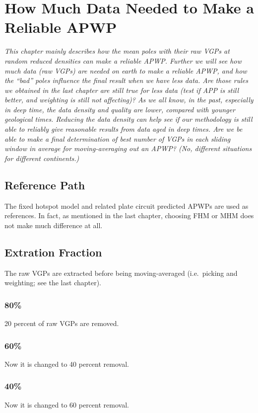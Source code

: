 \chapter{How Much Data Needed to Make a Reliable APWP}\label{chap:DatNeed}
\textit{This chapter mainly describes how the mean poles with their raw VGPs
at random reduced densities can make a reliable APWP\@. Further we will see how
much data (raw VGPs) are needed on earth to make a reliable APWP, and how the
``bad'' poles influence the final result when we have less data. Are those
rules we obtained in the last chapter are still true for less data (test if APP
is still better, and weighting is still not affecting)? As we all know, in the
past, especially in deep time, the data density and quality are lower, compared
with younger geological times. Reducing the data density can help see if our
methodology is still able to reliably give reasonable results from data aged in
deep times. Are we be able to make a final determination of best number of VGPs
in each sliding window in average for moving-averaging out an APWP? (No,
different situations for different continents.)}
\vfill
\minitoc\newpage

\section{Reference Path}

The fixed hotspot model and related plate circuit predicted APWPs are used as
references. In fact, as mentioned in the last chapter, choosing FHM or MHM does
not make much difference at all.

\section{Extration Fraction}

The raw VGPs are extracted before being moving-averaged (i.e.\ picking and weighting;
see the last chapter).

\subsection{80\%}
20 percent of raw VGPs are removed.

\subsection{60\%}
Now it is changed to 40 percent removal.

\subsection{40\%}
Now it is changed to 60 percent removal.

